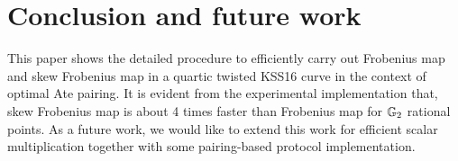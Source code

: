 \begin{table}[!ht]
\caption{Computational cost}
\label{tab2}
\end{table}
\renewcommand{\baselinestretch}{1.0}

\section{Conclusion and future work}
This paper shows the detailed procedure to efficiently carry out Frobenius map and skew Frobenius map in a quartic twisted KSS16 curve in the context of optimal Ate pairing. It is  evident from the experimental implementation that, skew Frobenius map is about 4 times faster than Frobenius map for ${\mathbb{G}}_{2}$ rational points. As a future work, we would like to extend this work for efficient scalar multiplication together with some pairing-based protocol implementation.



